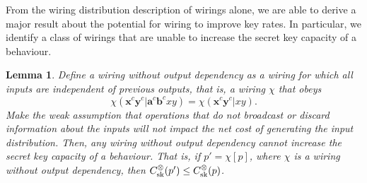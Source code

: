 \documentclass[10pt, a4paper]{article}
\numberwithin{equation}{section} %
\newcounter{stmt} %
\theoremstyle{definition}
\theoremstyle{plain}
\newtheorem{lemma}[stmt]{Lemma}
\newcommand{\?}{\mathrel{?}} %
\newcommand{\cvec}[1]{\boldsymbol{\mathbf{#1}}}    %
\newcommand{\sk}{\rm sk}
\begin{document}
                  From the wiring distribution description of wirings alone, we are able to derive a major result about the potential for wiring to improve key rates. In particular, we identify a class of wirings that are unable to increase the secret key capacity of a behaviour.
              \begin{lemma}\label{thm:outdep}
                Define a \emph{wiring without output dependency} as a wiring for which all inputs are independent of previous outputs, that is, a wiring \(\chi\) that obeys
                \begin{equation}\label{eqn:nooutputdep}
                  \chi(\cvec{x}^c\cvec{y}^c|\cvec{a}^c\cvec{b}^cxy) = \chi(\cvec{x}^c\cvec{y}^c|xy).
                \end{equation}
                Make the weak assumption that operations that do not broadcast or discard information about the inputs will not impact the net cost of generating the input distribution. Then, any wiring without output dependency cannot increase the secret key capacity of a behaviour. That is, if \(p' = \chi[p]\), where \(\chi\) is a wiring without output dependency, then \(C_{\sk}^{\otimes}(p') \leq C_{\sk}^{\otimes}(p)\).
              \end{lemma}
\end{document}
